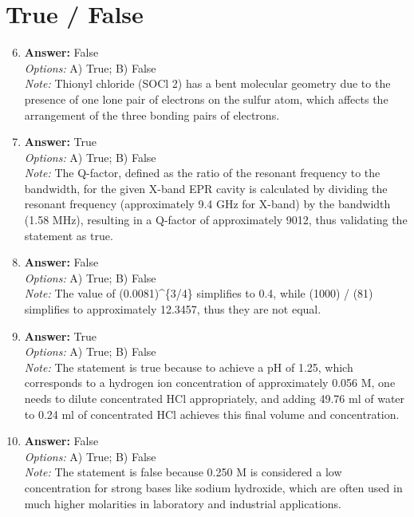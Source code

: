 \documentclass[12pt]{article}
\begin{document}
\section*{True / False}
\begin{enumerate}[label=\arabic*.]
\setcounter{enumi}{5}
\item \textbf{Answer:} False
\\ \textit{Options:} A) True; B) False
\\ \textit{Note:} Thionyl chloride (SOCl 2) has a bent molecular geometry due to the presence of one lone pair of electrons on the sulfur atom, which affects the arrangement of the three bonding pairs of electrons.
\item \textbf{Answer:} True
\\ \textit{Options:} A) True; B) False
\\ \textit{Note:} The Q-factor, defined as the ratio of the resonant frequency to the bandwidth, for the given X-band EPR cavity is calculated by dividing the resonant frequency (approximately 9.4 GHz for X-band) by the bandwidth (1.58 MHz), resulting in a Q-factor of approximately 9012, thus validating the statement as true.
\item \textbf{Answer:} False
\\ \textit{Options:} A) True; B) False
\\ \textit{Note:} The value of (0.0081)^\{3/4\} simplifies to 0.4, while (1000) / (81) simplifies to approximately 12.3457, thus they are not equal.
\item \textbf{Answer:} True
\\ \textit{Options:} A) True; B) False
\\ \textit{Note:} The statement is true because to achieve a pH of 1.25, which corresponds to a hydrogen ion concentration of approximately 0.056 M, one needs to dilute concentrated HCl appropriately, and adding 49.76 ml of water to 0.24 ml of concentrated HCl achieves this final volume and concentration.
\item \textbf{Answer:} False
\\ \textit{Options:} A) True; B) False
\\ \textit{Note:} The statement is false because 0.250 M is considered a low concentration for strong bases like sodium hydroxide, which are often used in much higher molarities in laboratory and industrial applications.
\end{enumerate}
\end{document}
